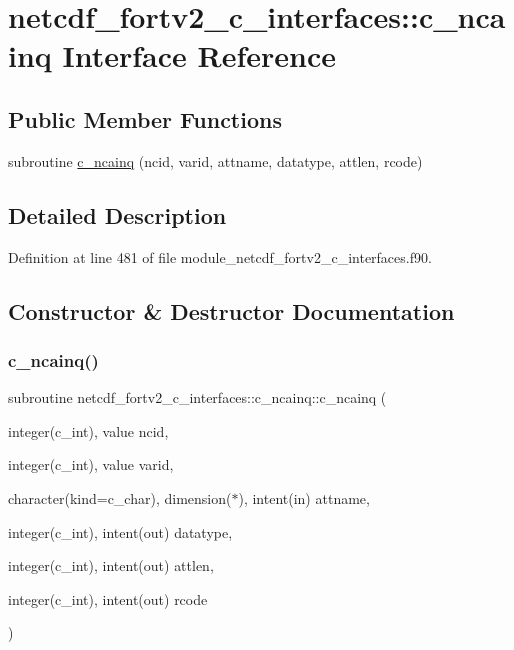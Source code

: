 \hypertarget{interfacenetcdf__fortv2__c__interfaces_1_1c__ncainq}{}\section{netcdf\+\_\+fortv2\+\_\+c\+\_\+interfaces\+:\+:c\+\_\+ncainq Interface Reference}
\label{interfacenetcdf__fortv2__c__interfaces_1_1c__ncainq}
\subsection*{Public Member Functions}
\begin{DoxyCompactItemize}
\item 
subroutine \hyperlink{interfacenetcdf__fortv2__c__interfaces_1_1c__ncainq_acb43ab04c59404497781580ad92482b3}{c\+\_\+ncainq} (ncid, varid, attname, datatype, attlen, rcode)
\end{DoxyCompactItemize}


\subsection{Detailed Description}


Definition at line 481 of file module\+\_\+netcdf\+\_\+fortv2\+\_\+c\+\_\+interfaces.\+f90.



\subsection{Constructor \& Destructor Documentation}
\mbox{\label{interfacenetcdf__fortv2__c__interfaces_1_1c__ncainq_acb43ab04c59404497781580ad92482b3}} 
\subsubsection{\texorpdfstring{c\+\_\+ncainq()}{c\_ncainq()}}
{\footnotesize\ttfamily subroutine netcdf\+\_\+fortv2\+\_\+c\+\_\+interfaces\+::c\+\_\+ncainq\+::c\+\_\+ncainq (\begin{DoxyParamCaption}\item[{integer(c\+\_\+int), value}]{ncid,  }\item[{integer(c\+\_\+int), value}]{varid,  }\item[{character(kind=c\+\_\+char), dimension($\ast$), intent(in)}]{attname,  }\item[{integer(c\+\_\+int), intent(out)}]{datatype,  }\item[{integer(c\+\_\+int), intent(out)}]{attlen,  }\item[{integer(c\+\_\+int), intent(out)}]{rcode }\end{DoxyParamCaption})}



